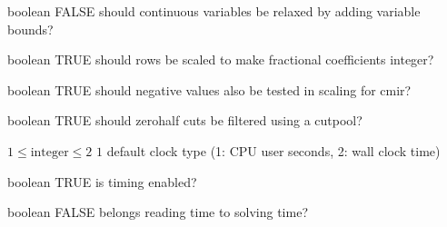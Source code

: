 %
{boolean}%
{FALSE}%
{should continuous variables be relaxed by adding variable bounds?}%
{}

%
{boolean}%
{TRUE}%
{should rows be scaled to make fractional coefficients integer?}%
{}

%
{boolean}%
{TRUE}%
{should negative values also be tested in scaling for cmir?}%
{}

%
{boolean}%
{TRUE}%
{should zerohalf cuts be filtered using a cutpool?}%
{}

%
{$1\leq\textrm{integer}\leq2$}%
{$1$}%
{default clock type (1: CPU user seconds, 2: wall clock time)}%
{}

%
{boolean}%
{TRUE}%
{is timing enabled?}%
{}

%
{boolean}%
{FALSE}%
{belongs reading time to solving time?}%
{}


